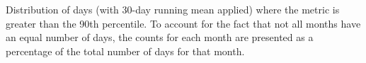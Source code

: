 \label{fig:annual_distribution}
Distribution of days (with 30-day running mean applied) where the metric is greater than the 90th percentile. To account for the fact that not all months have an equal number of days, the counts for each month are presented as a percentage of the total number of days for that month.   